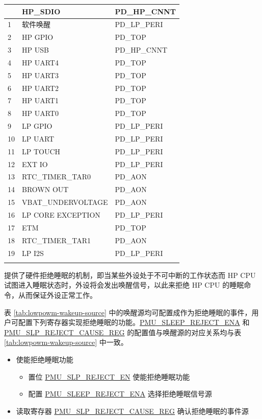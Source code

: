 \documentclass[main\_\_CN.tex]{subfiles}
\begin{document}
\begin{longtable}{ | l | l | l | }
{}{
    0 & HP\_SDIO & PD\_HP\_CNNT  \\\hline
    1 & 软件唤醒 & PD\_LP\_PERI \\\hline
    2 & HP GPIO   & PD\_TOP  \\\hline
    3 & HP USB  & PD\_HP\_CNNT  \\\hline
    4 & HP UART4 & PD\_TOP \\\hline
    5 & HP UART3 & PD\_TOP  \\\hline
    6 & HP UART2 & PD\_TOP  \\\hline
    7 & HP UART1 & PD\_TOP  \\\hline
    8 & HP UART0 & PD\_TOP  \\\hline
    9 & LP GPIO & PD\_LP\_PERI \\\hline
    10 & LP UART & PD\_LP\_PERI  \\\hline
    11 & LP TOUCH & PD\_LP\_PERI  \\\hline
    12 & EXT IO & PD\_LP\_PERI  \\\hline
    13 & RTC\_TIMER\_TAR0 & PD\_AON  \\\hline
    14 & BROWN OUT & PD\_AON  \\\hline
    15 & VBAT\_UNDERVOLTAGE & PD\_AON  \\\hline
    16 & LP CORE EXCEPTION & PD\_LP\_PERI  \\\hline
    17 & ETM & PD\_TOP  \\\hline
    18 & RTC\_TIMER\_TAR1 & PD\_AON  \\\hline
    19 & LP I2S & PD\_LP\_PERI  \\\hline
}
\end{longtable}

\chipname{} 提供了硬件拒绝睡眠的机制，即当某些外设处于不可中断的工作状态而 HP CPU 试图进入睡眠状态时，外设将会发出唤醒信号，以此来拒绝 HP CPU 的睡眠命令，从而保证外设正常工作。

表 \ref{tab:lowpowm-wakeup-source} 中的唤醒源均可配置成作为拒绝睡眠的事件，用户可配置下列寄存器实现拒绝睡眠的功能。\hyperref[fielddesc:PMUSLEEPREJECTENA]{PMU\_SLEEP\_REJECT\_ENA} 和 \hyperref[fielddesc:PMUREJECTCAUSE]{PMU\_SLP\_REJECT\_CAUSE\_REG} 的配置值与唤醒源的对应关系均与表 \ref{tab:lowpowm-wakeup-source} 中一致。

\begin{itemize}
\item 使能拒绝睡眠功能
    \begin{itemize}
    \item 置位 \hyperref[fielddesc:PMUSLPREJECTEN]{PMU\_SLP\_REJECT\_EN} 使能拒绝睡眠功能
    \item 配置 \hyperref[fielddesc:PMUSLEEPREJECTENA]{PMU\_SLEEP\_REJECT\_ENA} 选择拒绝睡眠信号源
    \end{itemize}

\item 读取寄存器 \hyperref[fielddesc:PMUREJECTCAUSE]{PMU\_SLP\_REJECT\_CAUSE\_REG} 确认拒绝睡眠的事件源
\end{itemize}
\end{document}
